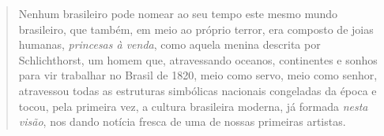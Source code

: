 \begin{quote}
Nenhum brasileiro pode nomear ao seu tempo este mesmo mundo brasileiro,
que também, em meio ao próprio terror, era composto de joias humanas,
\emph{princesas à venda}, como aquela menina descrita por Schlichthorst,
um homem que, atravessando oceanos, continentes e sonhos para vir
trabalhar no Brasil de 1820, meio como servo, meio como senhor,
atravessou todas as estruturas simbólicas nacionais congeladas da época
e tocou, pela primeira vez, a cultura brasileira moderna, já formada
\emph{nesta visão}, nos dando notícia fresca de uma de nossas primeiras
artistas.
\end{quote}
